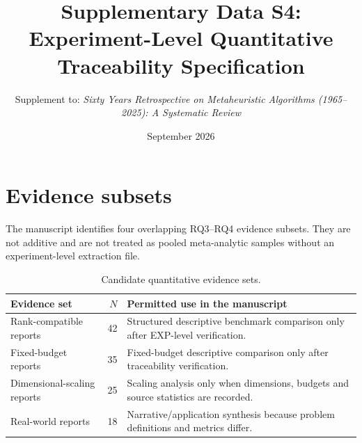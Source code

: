 \documentclass[10pt]{article}
\title{Supplementary Data S4: Experiment-Level Quantitative Traceability Specification}
\author{Supplement to: \textit{Sixty Years Retrospective on Metaheuristic Algorithms (1965--2025): A Systematic Review}}
\date{September 2026}
\begin{document}
\maketitle
\section*{Evidence subsets}
The manuscript identifies four overlapping RQ3--RQ4 evidence subsets. They are not additive and are not treated as pooled meta-analytic samples without an experiment-level extraction file.
\begin{table}[h]
\centering
\caption{Candidate quantitative evidence sets.}
\begin{tabular}{P{6.0cm}rP{7.0cm}}
\toprule
Evidence set & $N$ & Permitted use in the manuscript\\
\midrule
Rank-compatible reports & 42 & Structured descriptive benchmark comparison only after EXP-level verification.\\
Fixed-budget reports & 35 & Fixed-budget descriptive comparison only after traceability verification.\\
Dimensional-scaling reports & 25 & Scaling analysis only when dimensions, budgets and source statistics are recorded.\\
Real-world reports & 18 & Narrative/application synthesis because problem definitions and metrics differ.\\
\bottomrule
\end{tabular}
\end{table}
\end{document}
